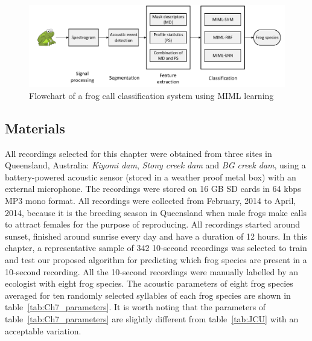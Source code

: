 \begin{figure}[htb!]
\centering
\includegraphics[width=\textwidth]{image/Ch6/flowchart.pdf}
\caption{Flowchart of a frog call classification system using MIML learning}
\label{fig:flowchart}
\end{figure}



\subsection{Materials}
\label{chap5:Materials}

All recordings selected for this chapter were obtained from three sites in Queensland, Australia: \textit{Kiyomi dam}, \textit{Stony creek dam} and  \textit{BG creek dam}, using a battery-powered acoustic sensor (stored in a weather proof metal box) with an external microphone. The recordings were stored on 16 GB SD cards in 64 kbps MP3 mono format. All recordings were collected from February, 2014 to April, 2014, because it is the breeding season in Queensland when male frogs make calls to attract females for the purpose of reproducing. All recordings started around sunset, finished around sunrise every day and have a duration of 12 hours. In this chapter, a representative sample of 342 10-second recordings was selected to train and test our proposed algorithm for predicting which frog species are present in a 10-second recording. All the 10-second recordings were manually labelled by an ecologist with eight frog species. The acoustic parameters of eight frog species averaged for ten randomly selected syllables of each frog species are shown in table~\ref{tab:Ch7_parameters}. It is worth noting that the parameters of table~\ref{tab:Ch7_parameters} are slightly different from table~\ref{tab:JCU} with an acceptable variation. 


